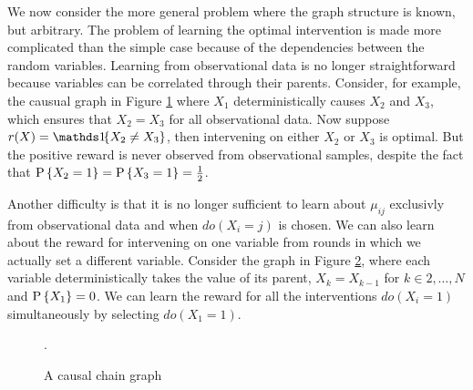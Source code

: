 
\newcommand{\calP}{\mathcal P}
\newcommand{\calA}{\mathcal A}
\newcommand{\x}{\boldsymbol{x}}
\newcommand{\Ps}{\operatorname{P}}

We now consider the more general problem where the graph structure is known, but arbitrary.
The problem of learning the optimal intervention is made more complicated than the simple case because of 
the dependencies between the random variables. Learning from observational data is no longer straightforward
because variables can be correlated through their parents. Consider, for example, the causual graph in Figure \ref{fig:causalStructure_confounded} where $X_1$
deterministically causes $X_2$ and $X_3$, which ensures that $X_2 = X_3$ for all observational data. Now suppose $r(X) = \ind{X_2 \neq X_3}$,
then intervening on either $X_2$ or $X_3$ is optimal. But the positive reward is never observed from observational samples, despite
the fact that $\P{X_2 = 1} = \P{X_3 = 1} = \frac{1}{2}$.
\begin{figure}[h]
\centering
{}
\caption{}\label{fig:causalStructure_confounded}
\end{figure} 

Another difficulty is that it is no longer sufficient to learn about $\mu_{ij}$ exclusivly from observational data and when $do(X_i = j)$ is chosen.
We can also learn about the reward for intervening on one variable from rounds in which we actually set a different variable.
Consider the graph in Figure \ref{fig:causalchain}, where each variable deterministically takes the value of its parent, $X_k = X_{k-1}$ 
for $k\in {2,\ldots,N}$ and $\P{X_1} = 0$. 
We can learn the reward for all the interventions $do(X_i = 1)$ simultaneously by selecting $do(X_1 = 1)$. 

\begin{figure}[h]
\centering
\caption{A causal chain graph}.
\label{fig:causalchain}
\end{figure} 




